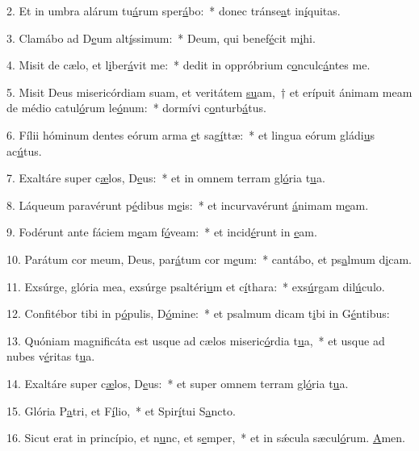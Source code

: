 2. Et in umbra alárum tu\uline{á}rum sper\uline{á}bo:~* donec tránse\uline{a}t in\uline{í}quitas.\par 
3. Clamábo ad D\uline{e}um alt\uline{í}ssimum:~* Deum, qui benef\uline{é}cit m\uline{i}hi.\par 
4. Misit de cælo, et l\uline{i}ber\uline{á}vit me:~* dedit in oppróbrium c\uline{o}nculc\uline{á}ntes me.\par 
5. Misit Deus misericórdiam suam, et veritátem \uline{su}am,~† et erípuit ánimam meam de médio catul\uline{ó}rum le\uline{ó}num:~* dormívi c\uline{o}nturb\uline{á}tus.\par 
6. Fílii hóminum dentes eórum arma \uline{e}t sag\uline{í}ttæ:~* et lingua eórum gládi\uline{u}s ac\uline{ú}tus.\par 
7. Exaltáre super c\uline{æ}los, D\uline{e}us:~* et in omnem terram gl\uline{ó}ria t\uline{u}a.\par 
8. Láqueum paravérunt p\uline{é}dibus m\uline{e}is:~* et incurvavérunt \uline{á}nimam m\uline{e}am.\par 
9. Fodérunt ante fáciem m\uline{e}am f\uline{ó}veam:~* et incid\uline{é}runt in \uline{e}am.\par 
10. Parátum cor meum, Deus, par\uline{á}tum cor m\uline{e}um:~* cantábo, et ps\uline{a}lmum d\uline{i}cam.\par 
11. Exsúrge, glória mea, exsúrge psaltéri\uline{u}m et c\uline{í}thara:~* exs\uline{ú}rgam dil\uline{ú}culo.\par 
12. Confitébor tibi in p\uline{ó}pulis, D\uline{ó}mine:~* et psalmum dicam t\uline{i}bi in G\uline{é}ntibus:\par 
13. Quóniam magnificáta est usque ad cælos miseric\uline{ó}rdia t\uline{u}a,~* et usque ad nubes v\uline{é}ritas t\uline{u}a.\par 
14. Exaltáre super c\uline{æ}los, D\uline{e}us:~* et super omnem terram gl\uline{ó}ria t\uline{u}a.\par 
15. Glória P\uline{a}tri, et F\uline{í}lio,~* et Spir\uline{í}tui S\uline{a}ncto.\par 
16. Sicut erat in princípio, et n\uline{u}nc, et s\uline{e}mper,~* et in sǽcula sæcul\uline{ó}rum. \uline{A}men.\par 
